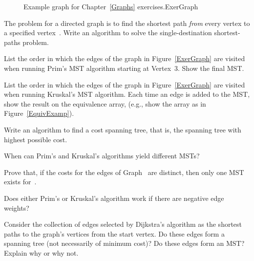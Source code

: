 \begin{exercises}
\begin{figure}
\vspace{-\bigskipamount}\vspace{-\smallskipamount}

{Example graph for Chapter~\ref{Graphs} exercises.}{ExerGraph}
\medskip
\end{figure}

\item
The  problem for a directed
graph is to find the shortest path \emph{from} every vertex to a
specified vertex~.
Write an algorithm to solve the single-destination shortest-paths
problem.

\item
List the order in which the edges of the graph in
Figure~\ref{ExerGraph} are visited when running Prim's MST algorithm
starting at Vertex~3.
Show the final MST.

\item
List the order in which the edges of the graph in
Figure~\ref{ExerGraph} are visited when running
Kruskal's 
MST algorithm.
Each time an edge is added to the MST, show the result on the
equivalence array, (e.g., show the array as in
Figure~\ref{EquivExamp}).

\item
Write an algorithm to find a  cost spanning tree, that
is, the spanning tree with highest possible cost.

\item
When can Prim's and Kruskal's algorithms yield different MSTs?

\item
Prove that, if the costs for the edges of Graph~ are distinct,
then only one MST exists for~.

\item
Does either Prim's or Kruskal's algorithm work if there are negative
edge weights?

\item
Consider the collection of edges selected by
Dijkstra's algorithm as the shortest paths to the graph's vertices
from the start vertex.
Do these edges form a spanning tree (not necessarily of minimum cost)?
Do these edges form an MST?
Explain why or why not.


\end{exercises}
